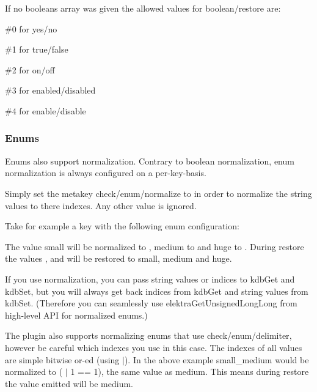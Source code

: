 If no {\ttfamily booleans} array was given the allowed values for {\ttfamily boolean/restore} are\+:


\begin{DoxyItemize}
\item {\ttfamily \#0} for {\ttfamily yes}/{\ttfamily no}
\item {\ttfamily \#1} for {\ttfamily true}/{\ttfamily false}
\item {\ttfamily \#2} for {\ttfamily on}/{\ttfamily off}
\item {\ttfamily \#3} for {\ttfamily enabled}/{\ttfamily disabled}
\item {\ttfamily \#4} for {\ttfamily enable}/{\ttfamily disable}
\end{DoxyItemize}

\subsubsection*{Enums}

Enums also support normalization. Contrary to boolean normalization, enum normalization is always configured on a per-\/key-\/basis.

Simply set the metakey {\ttfamily check/enum/normalize} to {} in order to normalize the string values to there indexes. Any other value is ignored.

Take for example a key with the following enum configuration\+:




The value {\ttfamily small} will be normalized to {}, {\ttfamily medium} to {} and {\ttfamily huge} to {}. During restore the values {}, {} and {} will be restored to {\ttfamily small}, {\ttfamily medium} and {\ttfamily huge}.

If you use normalization, you can pass string values or indices to {\ttfamily kdb\+Get} and {\ttfamily kdb\+Set}, but you will always get back indices from {\ttfamily kdb\+Get} and string values from {\ttfamily kdb\+Set}. (Therefore you can seamlessly use {\ttfamily elektra\+Get\+Unsigned\+Long\+Long} from high-\/level A\+PI for normalized enums.)

The plugin also supports normalizing enums that use {\ttfamily check/enum/delimiter}, however be careful which indexes you use in this case. The indexes of all values are simple bitwise or-\/ed (using {\ttfamily $\vert$}). In the above example {\ttfamily small\+\_\+medium} would be normalized to {} ({ $\vert$ 1 == 1}), the same value as {\ttfamily medium}. This means during restore the value emitted will be {\ttfamily medium}.

